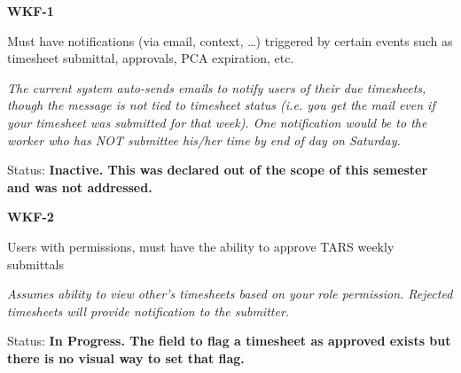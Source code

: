\noindent 

\noindent \textbf{WKF-1}

\noindent Must have notifications (via email, context, \dots ) triggered by certain events such as timesheet submittal, approvals, PCA expiration, etc.

\noindent \textit{The current system auto-sends emails to notify users of their due timesheets, though the message is not tied to timesheet status (i.e. you get the mail even if your timesheet was submitted for that week). One notification would be to the worker who has NOT submittee his/her time by end of day on Saturday.}

\noindent Status: \textbf{Inactive.  This was declared out of the scope of this semester and was not addressed.}\\

\noindent 

\noindent \textbf{WKF-2}

\noindent Users with permissions, must have the ability to approve TARS weekly submittals

\noindent \textit{Assumes ability to view other's timesheets based on your role permission. Rejected timesheets will provide notification to the submitter.}

\noindent Status: \textbf{In Progress.  The field to flag a timesheet as approved exists but there is no visual way to set that flag.}
